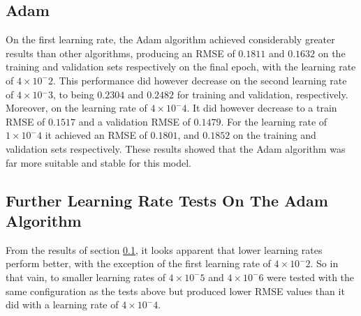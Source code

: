\documentclass[12pt,a4paper,oneside,oldfontcommands]{memoir}
\begin{document}
\subsection{Adam} \label{Adam}

On the first learning rate, the Adam algorithm achieved considerably greater results than other algorithms, producing an RMSE of \(0.1811\) and \(0.1632\) on the training and validation sets respectively on the final epoch, with the learning rate of \(4\times{10^-2}\). This performance did however decrease on the second learning rate of \(4\times10{^-3}\), to being \(0.2304\) and \(0.2482\) for training and validation, respectively. Moreover, on the learning rate of \(4\times{10^-4}\). It did however decrease to a train RMSE of \(0.1517\) and a validation RMSE of \(0.1479\). For the learning rate of \(1\times{10^-4}\) it achieved an RMSE of \(0.1801\), and \(0.1852\) on the training and validation sets respectively. These results showed that the Adam algorithm was far more suitable and stable for this model. 

\subsection{Further Learning Rate Tests On The Adam Algorithm}

From the results of section \ref{Adam}, it looks apparent that lower learning rates perform better, with the exception of the first learning rate of \(4\times{10^-2}\). So in that vain, to smaller learning rates of \(4\times{10^-5}\) and \(4\times{10^-6}\) were tested with the same configuration as the tests above but produced lower RMSE values than it did with a learning rate of \(4\times{10^-4}\).
\end{document}
